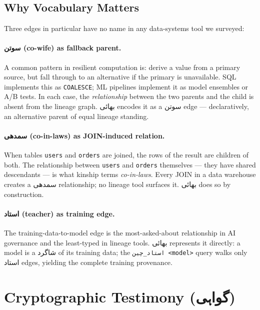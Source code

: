 \documentclass[10pt,twocolumn]{article}
\newcommand{\ur}[1]{{\urdufont #1}}
\begin{document}
\subsection{Why Vocabulary Matters}

Three edges in particular have no name in any data-systems tool we surveyed:

\paragraph{\ur{سوتن} (co-wife) as fallback parent.}
A common pattern in resilient computation is: derive a value from a primary source, but fall through to an alternative if the primary is unavailable. SQL implements this as \texttt{COALESCE}; ML pipelines implement it as model ensembles or A/B tests. In each case, the \emph{relationship} between the two parents and the child is absent from the lineage graph. \ur{بھائی} encodes it as a \ur{سوتن} edge — declaratively, an alternative parent of equal lineage standing.

\paragraph{\ur{سمدھی} (co-in-laws) as JOIN-induced relation.}
When tables \texttt{users} and \texttt{orders} are joined, the rows of the result are children of both. The relationship between \texttt{users} and \texttt{orders} themselves — they have shared descendants — is what kinship terms \emph{co-in-laws}. Every JOIN in a data warehouse creates a \ur{سمدھی} relationship; no lineage tool surfaces it. \ur{بھائی} does so by construction.

\paragraph{\ur{استاد} (teacher) as training edge.}
The training-data-to-model edge is the most-asked-about relationship in AI governance and the least-typed in lineage tools. \ur{بھائی} represents it directly: a model is a \ur{شاگرد} of its training data; the \texttt{\ur{استاد\_چین} <model>} query walks only \ur{استاد} edges, yielding the complete training provenance.

\section{Cryptographic Testimony (\ur{گواہی})}
\label{sec:crypto}
\end{document}
